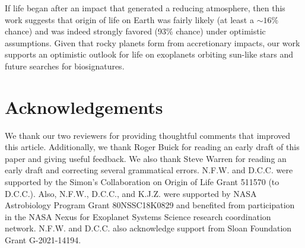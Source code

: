 \documentclass{Liebert_Author}
\begin{document}
If life began after an impact that generated a reducing atmosphere, then this work suggests that origin of life on Earth was fairly likely (at least a $\sim 16\%$ chance) and was indeed strongly favored (93\% chance) under optimistic assumptions. Given that rocky planets form from accretionary impacts, our work supports an optimistic outlook for life on exoplanets orbiting sun-like stars and future searches for biosignatures. 

\section*{Acknowledgements}

We thank our two reviewers for providing thoughtful comments that improved this article. Additionally, we thank Roger Buick for reading an early draft of this paper and giving useful feedback. We also thank Steve Warren for reading an early draft and correcting several grammatical errors. N.F.W. and D.C.C. were supported by the Simon's Collaboration on Origin of Life Grant 511570 (to D.C.C.). Also, N.F.W., D.C.C., and K.J.Z. were supported by NASA Astrobiology Program Grant 80NSSC18K0829 and benefited from participation in the NASA Nexus for Exoplanet Systems Science research coordination network. N.F.W. and D.C.C. also acknowledge support from Sloan Foundation Grant G-2021-14194.





\newpage
\end{document}
